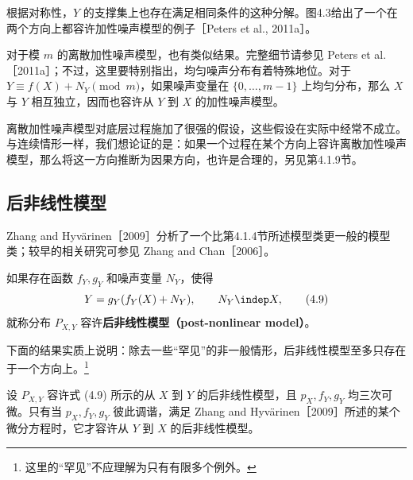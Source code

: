 根据对称性，$Y$ 的支撑集上也存在满足相同条件的这种分解。图4.3给出了一个在两个方向上都容许加性噪声模型的例子［Peters et al., 2011a］。



对于模 $m$ 的离散加性噪声模型，也有类似结果。完整细节请参见 Peters et al.［2011a］；不过，这里要特别指出，均匀噪声分布有着特殊地位。对于 $Y\equiv f(X)+N_Y\pmod m$，如果噪声变量在 $\{0,\ldots,m-1\}$ 上均匀分布，那么 $X$ 与 $Y$ 相互独立，因而也容许从 $Y$ 到 $X$ 的加性噪声模型。

离散加性噪声模型对底层过程施加了很强的假设，这些假设在实际中经常不成立。与连续情形一样，我们想论证的是：如果一个过程在某个方向上容许离散加性噪声模型，那么将这一方向推断为因果方向，也许是合理的，另见第4.1.9节。

\subsection{后非线性模型}

Zhang and Hyvärinen［2009］分析了一个比第4.1.4节所述模型类更一般的模型类；较早的相关研究可参见 Zhang and Chan［2006］。

\begin{definition}[后非线性模型]
如果存在函数 $f_Y,g_Y$ 和噪声变量 $N_Y$，使得
\begin{equation}
 Y=g_Y(f_Y(X)+N_Y),\qquad N_Y\indep X,
 \tag{4.9}
\end{equation}
就称分布 $P_{X,Y}$ 容许\textbf{后非线性模型（post-nonlinear model）}。
\end{definition}

下面的结果实质上说明：除去一些“罕见”的非一般情形，后非线性模型至多只存在于一个方向上。\footnote{这里的“罕见”不应理解为只有有限多个例外。}

\begin{theorem}[后非线性模型的可识别性]
设 $P_{X,Y}$ 容许式 (4.9) 所示的从 $X$ 到 $Y$ 的后非线性模型，且 $p_X,f_Y,g_Y$ 均三次可微。只有当 $p_X,f_Y,g_Y$ 彼此调谐，满足 Zhang and Hyvärinen［2009］所述的某个微分方程时，它才容许从 $Y$ 到 $X$ 的后非线性模型。
\end{theorem}

